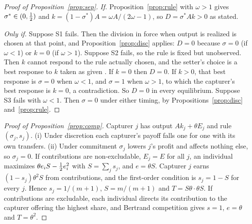 \begin{proof}[Proof of Proposition~\ref{prop:sep}]
\emph{If.} Proposition~\ref{prop:rule} with $\omega>1$ gives $\sigma^*\in(0,\tfrac{1}{2})$ and
$k=(1-\sigma^*)A=\omega A/(2\omega-1)$, so $D=\sigma^*Ak>0$ as stated.

\emph{Only if.} Suppose S1 fails. Then the division in force when output is realized is
chosen at that point, and Proposition~\ref{prop:disc} applies: $D=0$ because $\sigma=0$
(if $\omega<1$) or $k=0$ (if $\omega>1$). Suppose S2 fails, so the rule is fixed but
unobserved. Then $k$ cannot respond to the rule actually chosen, and the setter's choice
is a best response to $k$ taken as given \citep{Bagwell1995}. If $k=0$ then $D=0$. If $k>0$,
that best response is $\sigma=0$ when $\omega<1$, and $\sigma=1$ when $\omega>1$, to which
the capturer's best response is $k=0$, a contradiction. So $D=0$ in every equilibrium.
Suppose S3 fails with $\omega<1$. Then $\sigma=0$ under either timing, by
Propositions~\ref{prop:disc} and~\ref{prop:rule}.
\end{proof}

\begin{proof}[Proof of Proposition~\ref{prop:comp}]
Capturer $j$ has output $Ak_j+\theta E_j$ and rule $(\sigma_j,s_j)$. (i) Under discretion
each capturer's payoff falls one for one with its own transfers. (ii) Under commitment
$\sigma_j$ lowers $j$'s profit and affects nothing else, so $\sigma_j=0$. If
contributions are non-excludable, $E_j=E$ for all $j$, an individual maximizes
$\theta e_iS-\tfrac{1}{2} e_i^2$ with $S=\sum_j s_j$, and $e=\theta S$. Capturer $j$ earns
$(1-s_j)\theta^2S$ from contributions, and the first-order condition is $s_j=1-S$ for
every $j$. Hence $s_j=1/(m+1)$, $S=m/(m+1)$ and $T=S\theta\cdot\theta S$. If contributions
are excludable, each individual directs its contribution to the capturer offering the
highest share, and Bertrand competition gives $s=1$, $e=\theta$ and $T=\theta^2$.
\end{proof}





